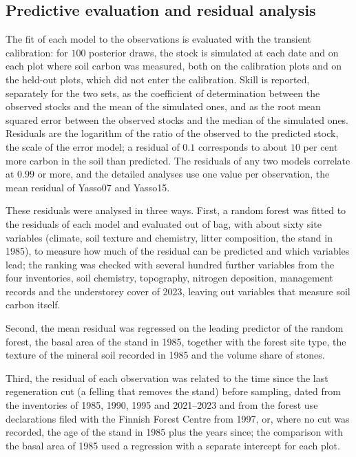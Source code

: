 \documentclass[11pt]{article}
\begin{document}
\subsection{Predictive evaluation and residual analysis}\label{sec:residuals_methods}

The fit of each model to the observations is evaluated with the transient calibration: for $100$ posterior draws, the stock is simulated at each date and on each plot where soil carbon was measured, both on the calibration plots and on the held-out plots, which did not enter the calibration. Skill is reported, separately for the two sets, as the coefficient of determination between the observed stocks and the mean of the simulated ones, and as the root mean squared error between the observed stocks and the median of the simulated ones.
Residuals are the logarithm of the ratio of the observed to the predicted stock, the scale of the error model; a residual of $0.1$ corresponds to about $10$ per cent more carbon in the soil than predicted. The
residuals of any two models correlate at $0.99$ or more, and the detailed analyses use one value
per observation, the mean residual of Yasso07 and Yasso15.

These residuals were analysed in three ways. 
First, a random forest was fitted to the residuals of each model and
evaluated out of bag, with about sixty site variables (climate, soil texture and chemistry, litter
composition, the stand in 1985), to measure how much of the residual can be predicted and which
variables lead; the ranking was checked with several hundred further variables from the four
inventories, soil chemistry, topography, nitrogen deposition, management records and the
understorey cover of 2023, leaving out variables that measure soil carbon itself. 

Second, the mean
residual was regressed on the leading predictor of the random forest, the basal area of the stand in 1985, together with the
forest site type, the texture of the mineral soil recorded in 1985 and the volume share of stones.

Third, the residual of each observation was related to the time since the last regeneration cut (a
felling that removes the stand) before sampling, dated from the inventories of 1985, 1990, 1995
and 2021--2023 and from the forest use declarations filed with the Finnish Forest Centre from 1997,
or, where no cut was recorded, the age of the stand in 1985 plus the years since; the comparison
with the basal area of 1985 used a regression with a separate intercept for each plot.



\end{document}
